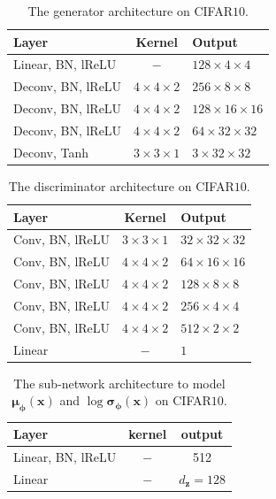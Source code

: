 \documentclass[letterpaper]{article} %
\newcommand{\xv}[0]{\ensuremath{\boldsymbol{x}} }
\newcommand{\zv}[0]{\ensuremath{\boldsymbol{z}} }
\newcommand{\muv}[0]{\ensuremath{\boldsymbol{\mu}} }
\newcommand{\sigmav}[0]{\ensuremath{\boldsymbol{\sigma}} }
\newcommand{\phiv}[0]{\ensuremath{\boldsymbol{\phi}} }
\begin{document}
\begin{table}[H]\centering
	\caption{The generator architecture on CIFAR$10$.}\label{tab:network_CIFAR10_G}
	\begin{tabular}{lcl}\hline\hline
		Layer             & Kernel             & Output                  \\ \hline
		Linear, BN, lReLU & $-$                & $128\times4  \times 4$ \\ \hline
		Deconv, BN, lReLU & $4\times4\times2$  & $256 \times8  \times 8$ \\ \hline
		Deconv, BN, lReLU & $4\times4\times2$  & $128 \times16 \times16$ \\ \hline
		Deconv, BN, lReLU & $4\times4\times2$  & $64   \times32 \times32$ \\ \hline
		Deconv, Tanh      & $3\times3\times1$  & $3   \times32 \times32$ \\ \hline\hline
	\end{tabular}
\end{table}
\begin{table}[H]\centering
	\caption{The discriminator architecture on CIFAR$10$. }\label{tab:network_CIFAR10_D}
	\begin{tabular}{lcl} \hline\hline
		Layer           & Kernel            & Output                 \\ \hline
		Conv, BN, lReLU & $3\times3\times1$ & $32\times32\times32$  \\ \hline
		Conv, BN, lReLU & $4\times4\times2$ & $64\times16\times16$    \\ \hline
		Conv, BN, lReLU & $4\times4\times2$ & $128\times8\times8$    \\ \hline
		Conv, BN, lReLU & $4\times4\times2$ & $256\times4\times4$    \\ \hline
		Conv, BN, lReLU & $4\times4\times2$ & $512\times2\times2$  \\ \hline
		Linear          & $-$               & $1$                    \\ \hline\hline
	\end{tabular}
\end{table}
\begin{table}[H]\centering
	\caption{The sub-network architecture to model $\muv_{\phiv}(\xv)$ and $\log\sigmav_{\phiv}(\xv)$ on CIFAR$10$.}\label{tab:sub_q_cifar}
	\begin{tabular}{lcc}\hline\hline
		Layer               & kernel      & output        \\ \hline
		Linear, BN, lReLU   & $-$         & 512          \\ \hline
		Linear              & $-$         & $d_{\zv}=128$        \\ \hline\hline
	\end{tabular}
\end{table}
\end{document}
